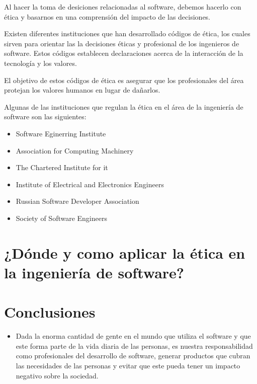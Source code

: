 \documentclass[twoside]{article}
\begin{document}
\begin{multicols}{2}
Al hacer la toma de desiciones relacionadas al software, debemos hacerlo con
ética y basarnos en una comprensión del impacto de las decisiones.

Existen diferentes instituciones que han desarrollado códigos de ética, los
cuales sirven para orientar las la decisiones éticas y profesional de los
ingenieros de software. Estos códigos establecen declaraciones acerca de la
interacción de la tecnología y los valores.

El objetivo de estos códigos de ética es asegurar que los profesionales del área
protejan los valores humanos en lugar de dañarlos.

Algunas de las instituciones que regulan la ética en el área de la ingeniería de
software son las siguientes:

\begin{itemize}
    \item Software Eginerring Institute
    \item Association for Computing Machinery
    \item The Chartered Institute for it
    \item Institute of Electrical and Electronics Engineers
    \item Russian Software Developer Association
    \item Society of Software Engineers
\end{itemize}


\section{¿Dónde y como aplicar la ética en la ingeniería de software?}


\section{Conclusiones}

\begin{itemize}
\item Dada la enorma cantidad de gente en el mundo que utiliza el software y
que este forma parte de la vida diaria de las personas, es nuestra
responsabilidad como profesionales del desarrollo de software, generar productos
que cubran las necesidades de las personas y evitar que este pueda tener un
impacto negativo sobre la sociedad.

\end{itemize}


\pagebreak
 


\end{multicols}
\end{document}

